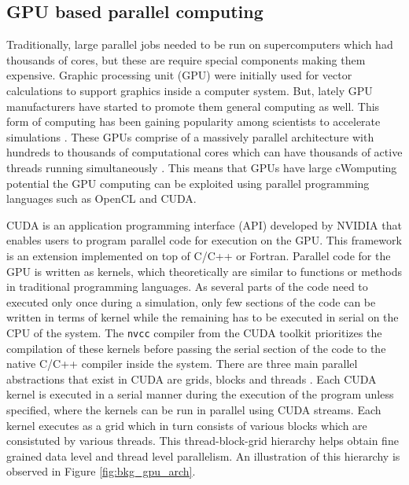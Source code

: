 \documentclass[preprint,10pt,authoryear,review]{elsarticle}
\begin{document}
\begin{linenumbers}
\subsection{GPU based parallel computing}
Traditionally, large parallel jobs needed to be run on supercomputers which had thousands 
of cores, but these are require special components making them expensive.
Graphic processing unit (GPU) were initially used for vector calculations to support 
graphics inside a computer system. But, lately GPU manufacturers have started to promote them 
general computing as well. This form of computing has been gaining popularity among scientists 
to accelerate simulations \citep{kandrot2011}. These GPUs comprise of a 
massively parallel architecture with hundreds to thousands of computational cores 
which can have thousands of active threads running simultaneously \citep{keckler2011}. 
This means that GPUs have large cWomputing potential the GPU computing can be exploited using parallel programming languages 
such as OpenCL and CUDA. 

CUDA is an application programming interface (API) developed by NVIDIA \citep{NVIDIA2012} 
that enables users to program parallel code for execution on the GPU. This framework is an 
extension implemented on top of C/C++ or Fortran. Parallel code for the GPU is written 
as kernels, which theoretically are similar to functions or methods in traditional 
programming languages. As several parts of the code need to executed only once during a simulation, 
only few sections of the code can be written in terms of kernel while the remaining has 
to be executed in serial on the CPU of the system. The \texttt{nvcc} 
compiler from the CUDA toolkit prioritizes the compilation of these kernels before 
passing the serial section of the code to the native C/C++ compiler inside the system. 
There are three main parallel abstractions that exist in CUDA are grids, blocks and 
threads \citep{santos2013}. Each CUDA kernel is executed in a serial manner during the execution 
of the program unless specified, where the kernels can be run in parallel using CUDA 
streams. Each kernel executes as a grid which in turn consists of various blocks which 
are consistuted by various threads. This thread-block-grid hierarchy helps obtain fine 
grained data level and thread level parallelism. An illustration of this hierarchy is 
observed in Figure \ref{fig:bkg_gpu_arch}.


\end{linenumbers}
\end{document}
